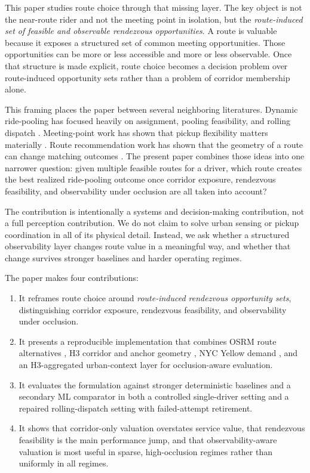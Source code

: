 \documentclass[journal]{IEEEtran}
\begin{document}
This paper studies route choice through that missing layer. The key object is not the near-route rider and not the meeting point in isolation, but the \emph{route-induced set of feasible and observable rendezvous opportunities}. A route is valuable because it exposes a structured set of common meeting opportunities. Those opportunities can be more or less accessible and more or less observable. Once that structure is made explicit, route choice becomes a decision problem over route-induced opportunity sets rather than a problem of corridor membership alone.

This framing places the paper between several neighboring literatures. Dynamic ride-pooling has focused heavily on assignment, pooling feasibility, and rolling dispatch \cite{agatz2012,alonso2017,chen2021,xu2018dispatch,tang2021value}. Meeting-point work has shown that pickup flexibility matters materially \cite{stiglic2016,stumpe2024,zhou2026}. Route recommendation work has shown that the geometry of a route can change matching outcomes \cite{bassem2022,xia2019,liu2022personalizedroute}. The present paper combines those ideas into one narrower question: given multiple feasible routes for a driver, which route creates the best realized ride-pooling outcome once corridor exposure, rendezvous feasibility, and observability under occlusion are all taken into account?

The contribution is intentionally a systems and decision-making contribution, not a full perception contribution. We do not claim to solve urban sensing or pickup coordination in all of its physical detail. Instead, we ask whether a structured observability layer changes route value in a meaningful way, and whether that change survives stronger baselines and harder operating regimes.

The paper makes four contributions:
\begin{enumerate}
\item It reframes route choice around \emph{route-induced rendezvous opportunity sets}, distinguishing corridor exposure, rendezvous feasibility, and observability under occlusion.
\item It presents a reproducible implementation that combines OSRM route alternatives \cite{osrmapi}, H3 corridor and anchor geometry \cite{h3docs}, NYC Yellow demand \cite{azureyellow}, and an H3-aggregated urban-context layer for occlusion-aware evaluation.
\item It evaluates the formulation against stronger deterministic baselines and a secondary ML comparator in both a controlled single-driver setting and a repaired rolling-dispatch setting with failed-attempt retirement.
\item It shows that corridor-only valuation overstates service value, that rendezvous feasibility is the main performance jump, and that observability-aware valuation is most useful in sparse, high-occlusion regimes rather than uniformly in all regimes.
\end{enumerate}
\end{document}

